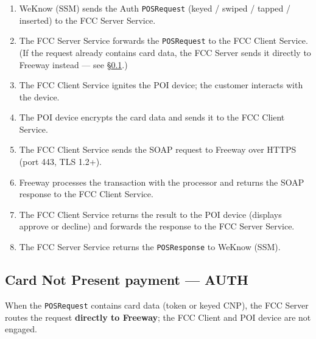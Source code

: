 \documentclass[a4paper,10pt]{article}
\begin{document}
\begin{enumerate}
  \item WeKnow (SSM) sends the Auth \texttt{POSRequest}
        (keyed / swiped / tapped / inserted) to the FCC Server Service.
  \item The FCC Server Service forwards the \texttt{POSRequest} to the
        FCC Client Service. (If the request already contains card data,
        the FCC Server sends it directly to Freeway instead --- see
        \S\ref{sec:cnp}.)
  \item The FCC Client Service ignites the POI device; the customer
        interacts with the device.
  \item The POI device encrypts the card data and sends it to the FCC
        Client Service.
  \item The FCC Client Service sends the SOAP request to Freeway over
        HTTPS (port 443, TLS 1.2+).
  \item Freeway processes the transaction with the processor and returns
        the SOAP response to the FCC Client Service.
  \item The FCC Client Service returns the result to the POI device
        (displays approve or decline) and forwards the response to the
        FCC Server Service.
  \item The FCC Server Service returns the \texttt{POSResponse} to
        WeKnow (SSM).
\end{enumerate}

\subsection{Card Not Present payment --- AUTH}\label{sec:cnp}

When the \texttt{POSRequest} contains card data (token or keyed CNP), the
FCC Server routes the request \textbf{directly to Freeway}; the FCC
Client and POI device are not engaged.
\end{document}
